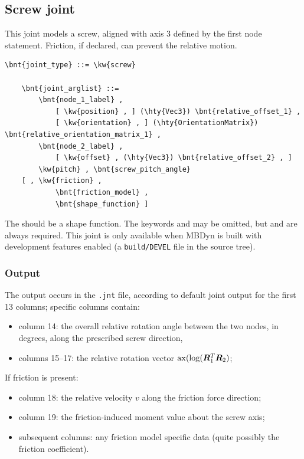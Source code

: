 \subsection{Screw joint}
\label{sec:screw}
This joint models a screw, aligned with axis 3 defined by the
first node  statement. 
Friction, if declared, can prevent the relative
motion.
\begin{Verbatim}[commandchars=\\\{\}]
    \bnt{joint_type} ::= \kw{screw}

    \bnt{joint_arglist} ::= 
        \bnt{node_1_label} ,
            [ \kw{position} , ] (\hty{Vec3}) \bnt{relative_offset_1} , 
            [ \kw{orientation} , ] (\hty{OrientationMatrix}) \bnt{relative_orientation_matrix_1} ,
        \bnt{node_2_label} ,
            [ \kw{offset} , (\hty{Vec3}) \bnt{relative_offset_2} , ]
        \kw{pitch} , \bnt{screw_pitch_angle}
	[ , \kw{friction} , 
            \bnt{friction_model} , 
            \bnt{shape_function} ]
\end{Verbatim}
The  should be a  shape function.
The keywords  and  may be omitted,
but  and 
are always required.
This joint is only available when MBDyn is built with development
features enabled (a \texttt{build/DEVEL} file in the source tree).
\subsubsection{Output}
The output occurs in the \texttt{.jnt} file, according to default joint output
for the first 13 columns; specific columns contain:
\begin{itemize}
\item column 14: the overall relative rotation angle between
        the two nodes, in degrees, along the prescribed screw direction,
\item columns 15--17: the relative rotation vector
	$\mathrm{ax}(\log(\boldsymbol{R}_{1}^T\boldsymbol{R}_2)$;
\end{itemize}
If friction is present:
\begin{itemize}
\item column 18: the relative velocity $v$ along the friction force direction;
\item column 19: the friction-induced moment value about the screw axis;
\item subsequent columns: any friction model specific data 
      (quite possibly the friction coefficient).
\end{itemize}

